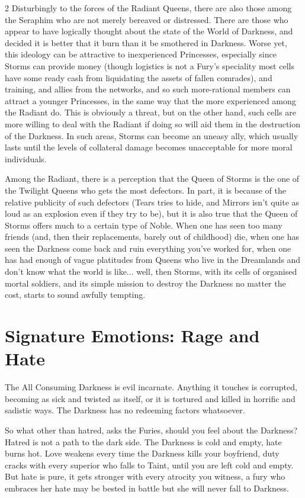 \begin{multicols}{2}
Disturbingly to the forces of the Radiant Queens, there are also those among the Seraphim who are not merely bereaved or distressed. There are those who appear to have logically thought about the state of the World of Darkness, and decided it is better that it burn than it be smothered in Darkness. Worse yet, this ideology can be attractive to inexperienced Princesses, especially since Storms can provide money (though logistics is not a Fury's speciality most cells have some ready cash from liquidating the assets of fallen comrades), and training, and allies from the networks, and so such more-rational members can attract a younger Princesses, in the same way that the more experienced among the Radiant do. This is obviously a threat, but on the other hand, such cells are more willing to deal with the Radiant if doing so will aid them in the destruction of the Darkness. In such areas, Storms can become an uneasy ally, which usually lasts until the levels of collateral damage becomes unacceptable for more 
moral individuals.

Among the Radiant, there is a perception that the Queen of Storms is the one of the Twilight Queens who gets the most defectors. In part, it is because of the relative publicity of such defectors (Tears tries to hide, and Mirrors isn't quite as loud as an explosion even if they try to be), but it is also true that the Queen of Storms offers much to a certain type of Noble. When one has seen too many friends (and, then their replacements, barely out of childhood) die, when one has seen the Darkness come back and ruin everything you've worked for, when one has had enough of vague platitudes from Queens who live in the Dreamlands and don't know what the world is like... well, then Storms, with its cells of organised mortal soldiers, and its simple mission to destroy the Darkness no matter the cost, starts to sound awfully tempting. 

\section*{Signature Emotions: Rage and Hate}

The All Consuming Darkness is evil incarnate. Anything it touches is corrupted, becoming as sick and twisted as itself, or it is tortured and killed in horrific and sadistic ways. The Darkness has no redeeming factors whatsoever. 

So what other than hatred, asks the Furies, should you feel about the Darkness? Hatred is not a path to the dark side. The Darkness is cold and empty, hate burns hot. Love weakens every time the Darkness kills your boyfriend, duty cracks with every superior who falls to Taint, until you are left cold and empty. But hate is pure, it gets stronger with every atrocity you witness, a fury who embraces her hate may be bested in battle but she will never fall to Darkness. 


\end{multicols}
